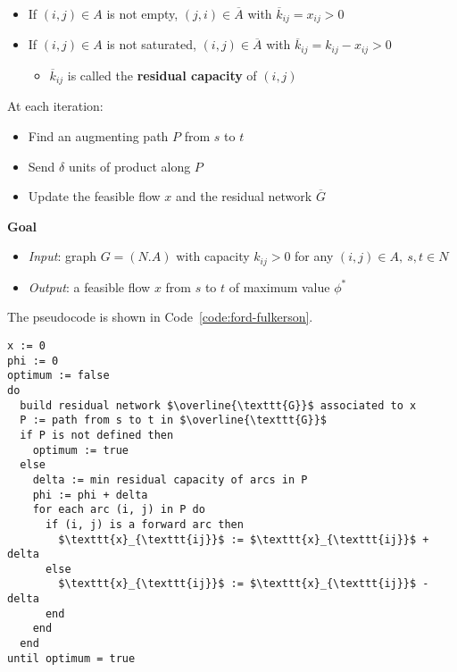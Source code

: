 \documentclass[english]{article}
\begin{document}
\begin{itemize}
  \item If \(\left( i, j \right) \in A\) is not empty, \(\left( j, i \right) \in \overline{A}\) with \(\overline{k}_{ij} = x_{ij} > 0\)
  \item If \(\left( i, j \right) \in A\) is not saturated, \(\left( i, j \right) \in \overline{A}\) with \(\overline{k}_{ij} = k_{ij} - x_{ij} > 0\)
        \begin{itemize}[label=\(\rightarrow\)]
          \item \(\overline{k}_{ij}\) is called the \textbf{residual capacity} of \(\left( i, j \right)\)
        \end{itemize}
\end{itemize}

At each iteration:

\begin{itemize}
  \item Find an augmenting path \(P\) from \(s\) to \(t\)
  \item Send \(\delta\) units of product along \(P\)
  \item Update the feasible flow \(x\) and the residual network \(\overline{G}\)
\end{itemize}

\bigskip
\textbf{Goal}
\begin{itemize}[label=\(\rightarrow\)]
  \item \textit{Input}: graph \(G = (N. A)\) with capacity \(k_{ij} > 0\) for any \((i, j) \in A, \ s,t \in N\)
  \item \textit{Output}: a feasible flow \(x\) from \(s\) to \(t\) of maximum value \(\phi^\ast\)
\end{itemize}

The pseudocode is shown in Code~\ref{code:ford-fulkerson}.

\begin{lstlisting}[caption={Ford-Fulkerson algorithm}, label={code:ford-fulkerson}]
x := 0
phi := 0
optimum := false
do
  build residual network $\overline{\texttt{G}}$ associated to x
  P := path from s to t in $\overline{\texttt{G}}$
  if P is not defined then
    optimum := true
  else
    delta := min residual capacity of arcs in P
    phi := phi + delta
    for each arc (i, j) in P do
      if (i, j) is a forward arc then
        $\texttt{x}_{\texttt{ij}}$ := $\texttt{x}_{\texttt{ij}}$ + delta
      else
        $\texttt{x}_{\texttt{ij}}$ := $\texttt{x}_{\texttt{ij}}$ - delta
      end
    end
  end
until optimum = true
\end{lstlisting}
\end{document}
